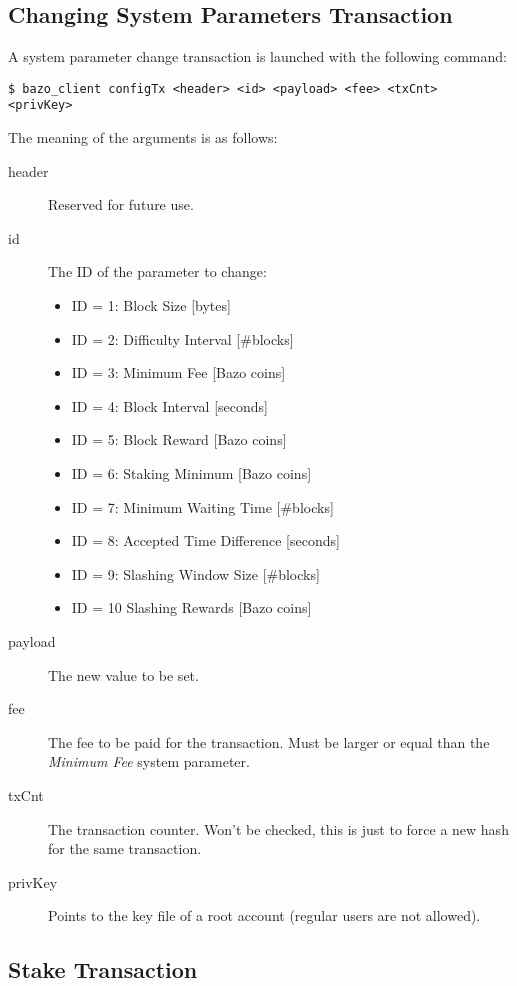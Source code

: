 \subsection{Changing System Parameters Transaction}\label{usage-configtx}

A system parameter change transaction is launched with the following command:

\begin{lstlisting}
$ bazo_client configTx <header> <id> <payload> <fee> <txCnt> 
<privKey>
\end{lstlisting}

The meaning of the arguments is as follows:

\begin{description}
	\item[header] Reserved for future use.
	\item[id] The ID of the parameter to change:
	\begin{itemize}
		\item ID = 1: Block Size [bytes]
		\item ID = 2: Difficulty Interval [\#blocks]
		\item ID = 3: Minimum Fee [Bazo coins]
		\item ID = 4: Block Interval [seconds]
		\item ID = 5: Block Reward [Bazo coins]
		\item ID = 6: Staking Minimum [Bazo coins]
		\item ID = 7: Minimum Waiting Time [\#blocks]
		\item ID = 8: Accepted Time Difference [seconds]
		\item ID = 9: Slashing Window Size [\#blocks]
		\item ID = 10 Slashing Rewards [Bazo coins]
	\end{itemize}
	\item[payload] The new value to be set.
	\item[fee] The fee to be paid for the transaction. Must be larger or equal than the \emph{Minimum Fee} system parameter.
	\item[txCnt] The transaction counter. Won't be checked, this is just to force a new hash for the same transaction.
	\item[privKey] Points to the key file of a root account (regular users are not allowed).
\end{description}



\subsection{Stake Transaction}\label{usage-staketx}

